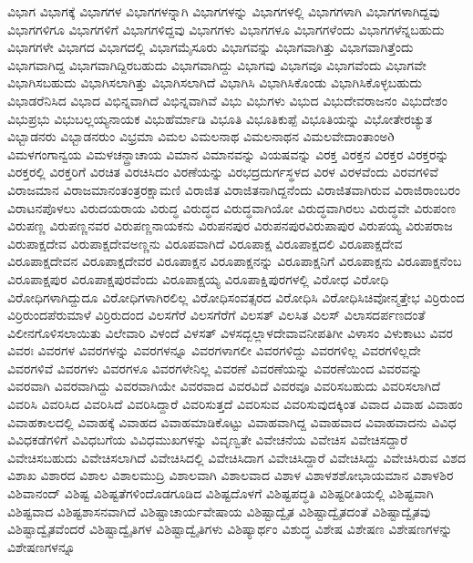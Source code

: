 {ವಿಭಾಗ
ವಿಭಾಗಕ್ಕೆ
ವಿಭಾಗಗಳ
ವಿಭಾಗಗಳನ್ನಾಗಿ
ವಿಭಾಗಗಳನ್ನು
ವಿಭಾಗಗಳಲ್ಲಿ
ವಿಭಾಗಗಳಾಗಿ
ವಿಭಾಗಗಳಾಗಿದ್ದವು
ವಿಭಾಗಗಳಿಗೂ
ವಿಭಾಗಗಳಿಗೆ
ವಿಭಾಗಗಳಿದ್ದವು
ವಿಭಾಗಗಳು
ವಿಭಾಗಗಳೂ
ವಿಭಾಗಗಳೆಂದು
ವಿಭಾಗಗಳೆನ್ನಬಹುದು
ವಿಭಾಗಗಳೇ
ವಿಭಾಗದ
ವಿಭಾಗದಲ್ಲಿ
ವಿಭಾಗಮೈಸೂರು
ವಿಭಾಗವನ್ನು
ವಿಭಾಗವಾಗಿತ್ತು
ವಿಭಾಗವಾಗಿತ್ತೆಂದು
ವಿಭಾಗವಾಗಿದ್ದ
ವಿಭಾಗವಾಗಿದ್ದಿರಬಹುದು
ವಿಭಾಗವಾಗಿದ್ದು
ವಿಭಾಗವು
ವಿಭಾಗವೂ
ವಿಭಾಗವೆಂದು
ವಿಭಾಗವೇ
ವಿಭಾಗಿಸಬಹುದು
ವಿಭಾಗಿಸಲಾಗಿತ್ತು
ವಿಭಾಗಿಸಲಾಗಿದೆ
ವಿಭಾಗಿಸಿ
ವಿಭಾಗಿಸಿಕೊಂಡು
ವಿಭಾಗಿಸಿಕೊಳ್ಳಬಹುದು
ವಿಭಾಡರೆನಿಸಿದ
ವಿಭಾದ
ವಿಭಿನ್ನವಾಗಿದೆ
ವಿಭಿನ್ನವಾಗಿವೆ
ವಿಭು
ವಿಭುಗಳು
ವಿಭುದ
ವಿಭುದೇವರಾಜನಂ
ವಿಭುದೇಶಂ
ವಿಭುಪ್ರಭು
ವಿಭುಬಲ್ಲಯ್ಯನಾಯಕ
ವಿಭುಹೆರ್ಮಾಡಿ
ವಿಭೂತಿ
ವಿಭೂತಿಕುಪ್ಪೆ
ವಿಭೂತಿಯನ್ನು
ವಿಭೋತೇರಚ್ಯುತ
ವಿಭ್ಬಾಡನರು
ವಿಭ್ಬಾಡನರುಂ
ವಿಭ್ರಮಾ
ವಿಮಲ
ವಿಮಲನಾಥ
ವಿಮಲನಾಥನ
ವಿಮಲವೇದಾಂತಾಂಅð
ವಿಮಳಗಂಗಾನ್ವಯ
ವಿಮಳಚನ್ದ್ರಾಚಾಯ
ವಿಮಾನ
ವಿಮಾನವನ್ನು
ವಿಯಷವನ್ನು
ವಿರಕ್ತ
ವಿರಕ್ತನ
ವಿರಕ್ತರ
ವಿರಕ್ತರನ್ನು
ವಿರಕ್ತರಲ್ಲಿ
ವಿರಕ್ತರಿಗೆ
ವಿರಚಿತ
ವಿರಚಿಸಿದಂ
ವಿರಣೆಯನ್ನು
ವಿರಭದ್ರದುರ್ಗಸ್ಥಳದ
ವಿರಳ
ವಿರಳವೆಂದು
ವಿರವಗಳಿವೆ
ವಿರಾಜಮಾನ
ವಿರಾಜಮಾನಂತಂತ್ರರಕ್ಷಾಮಣಿ
ವಿರಾಜಿತ
ವಿರಾಜಿತನಾಗಿದ್ದನೆಂದು
ವಿರಾಜಿತವಾಗಿರುವ
ವಿರಾಜಿರಾಂಬರಂ
ವಿರಾಟನಪೊಳಲು
ವಿರುದಯರಾಯ
ವಿರುದ್ಧ
ವಿರುದ್ಧದ
ವಿರುದ್ಧವಾಗಿಯೋ
ವಿರುದ್ಧವಾಗಿರಲು
ವಿರುದ್ಧವೇ
ವಿರುಪಂಣ
ವಿರುಪಣ್ಣ
ವಿರುಪಣ್ಣನವರ
ವಿರುಪಣ್ಣನಾಯಕನು
ವಿರುಪನಪುರ
ವಿರುಪನಪುರವಿರುಪಾಪುರ
ವಿರುಪಯ್ಯ
ವಿರುಪರಾಜ
ವಿರುಪಾಕ್ಷದೇವ
ವಿರುಪಾಕ್ಷದೇವಅಣ್ಣನು
ವಿರೂಪವಾಗಿದೆ
ವಿರೂಪಾಕ್ಷ
ವಿರೂಪಾಕ್ಷದಲಿ
ವಿರೂಪಾಕ್ಷದೇವ
ವಿರೂಪಾಕ್ಷದೇವನ
ವಿರೂಪಾಕ್ಷದೇವರ
ವಿರೂಪಾಕ್ಷನ
ವಿರೂಪಾಕ್ಷನನ್ನು
ವಿರೂಪಾಕ್ಷನಿಗೆ
ವಿರೂಪಾಕ್ಷನು
ವಿರೂಪಾಕ್ಷನೆಂಬ
ವಿರೂಪಾಕ್ಷಪುರ
ವಿರೂಪಾಕ್ಷಪುರವೆಂದು
ವಿರೂಪಾಕ್ಷಯ್ಯ
ವಿರೂಪಾಕ್ಷಿಪುರಗಳಲ್ಲಿ
ವಿರೋಧ
ವಿರೋಧಿ
ವಿರೋಧಿಗಳಾಗಿದ್ದುದೂ
ವಿರೋಧಿಗಳಾಗಿರಲಿಲ್ಲ
ವಿರೋಧಿಸಂವತ್ಸರದ
ವಿರೋಧಿಸಿ
ವಿರೋಧಿಸಿಚಿವೋನ್ಮತ್ತೇಭ
ವಿರ್ರಿರುಂದ
ವಿರ್ರಿರುಂದಪೆರುಮಾಳೆ
ವಿರ್ರಿರುದಂದ
ವಿಲಸಗೆರೆ
ವಿಲಸಗೆರೆಗೆ
ವಿಲಸತ್
ವಿಲಸಿತ
ವಿಲಸ್
ವಿಲಾಸದರ್ಪಣದಂತೆ
ವಿಲೀನಗೊಳಿಸಲಾಯಿತು
ವಿಲೇವಾರಿ
ವಿಳಂದೆ
ವಿಳಸತ್
ವಿಳಸದ್ಬಲ್ಲಾಳದೇವಾವನೀಪತಿಗೀ
ವಿಳಾಸಂ
ವಿಳುಕಾಟು
ವಿವರ
ವಿವರಃ
ವಿವರಗಳ
ವಿವರಗಳನ್ನು
ವಿವರಗಳನ್ನೂ
ವಿವರಗಳಾಗಲೀ
ವಿವರಗಳಿದ್ದು
ವಿವರಗಳಿಲ್ಲ
ವಿವರಗಳಿಲ್ಲದೇ
ವಿವರಗಳಿವೆ
ವಿವರಗಳು
ವಿವರಗಳೂ
ವಿವರಗಳೇನಿಲ್ಲ
ವಿವರಣೆ
ವಿವರಣೆಯನ್ನು
ವಿವರಣೆಯಿಂದ
ವಿವರವನ್ನು
ವಿವರವಾಗಿ
ವಿವರವಾಗಿದ್ದು
ವಿವರವಾಗಿಯೇ
ವಿವರವಾದ
ವಿವರವಿದೆ
ವಿವರವೂ
ವಿವರಿಸಬಹುದು
ವಿವರಿಸಲಾಗಿದೆ
ವಿವರಿಸಿ
ವಿವರಿಸಿದ
ವಿವರಿಸಿದೆ
ವಿವರಿಸಿದ್ದಾರೆ
ವಿವರಿಸುತ್ತದೆ
ವಿವರಿಸುವ
ವಿವರಿಸುವುದಕ್ಕಿಂತ
ವಿವಾದ
ವಿವಾಹ
ವಿವಾಹಂ
ವಿವಾಹಕಾಲದಲ್ಲಿ
ವಿವಾಹಕ್ಕೆ
ವಿವಾಹದ
ವಿವಾಹಮಾಡಿಕೊಟ್ಟು
ವಿವಾಹವಾಗಿದ್ದ
ವಿವಾಹವಾದ
ವಿವಾಹವಾದನು
ವಿವಿಧ
ವಿವಿಧಕಡೆಗಳಿಗೆ
ವಿವಿಧಬಗೆಯ
ವಿವಿಧಮುಖಗಳನ್ನು
ವಿವೃಣ್ವತೇ
ವಿವೇಚನೆಯ
ವಿವೇಚಿಸ
ವಿವೇಚಿಸದ್ದಾರೆ
ವಿವೇಚಿಸಬಹುದು
ವಿವೇಚಿಸಲಾಗಿದೆ
ವಿವೇಚಿಸಿದಲ್ಲಿ
ವಿವೇಚಿಸಿದಾಗ
ವಿವೇಚಿಸಿದ್ದಾರೆ
ವಿವೇಚಿಸಿದ್ದು
ವಿವೇಚಿಸಿರುವ
ವಿಶದ
ವಿಶಾಖ
ವಿಶಾರದ
ವಿಶಾಲ
ವಿಶಾಲಮುದ್ರಿ
ವಿಶಾಲವಾಗಿ
ವಿಶಾಲವಾದ
ವಿಶಾಳ
ವಿಶಾಳಶಶೋಭಾಯಮಾನ
ವಿಶಾಳಶಿರ
ವಿಶಿವಾನಂದ್
ವಿಶಿಷ್ಟ
ವಿಶಿಷ್ಟತೆಗಳಿಂದೊಡಗೂಡಿದ
ವಿಶಿಷ್ಟದೊಳಗೆ
ವಿಶಿಷ್ಟಪದ್ಧತಿ
ವಿಶಿಷ್ಟರೀತಿಯಲ್ಲಿ
ವಿಶಿಷ್ಟವಾಗಿ
ವಿಶಿಷ್ಟವಾದ
ವಿಶಿಷ್ಟಶಾಸನವಾಗಿದೆ
ವಿಶಿಷ್ಟಾಚಾರ್ಯವೇಷಾಯ
ವಿಶಿಷ್ಟಾದ್ವೈತ
ವಿಶಿಷ್ಟಾದ್ವೈತದಂತೆ
ವಿಶಿಷ್ಟಾದ್ವೈತವು
ವಿಶಿಷ್ಟಾದ್ವೈತವೆಂದರೆ
ವಿಶಿಷ್ಟಾದ್ವೈತಿಗಳ
ವಿಶಿಷ್ಟಾದ್ವೈತಿಗಳು
ವಿಶಿಷ್ಯಾರ್ಥಂ
ವಿಶುದ್ಧ
ವಿಶೇಷ
ವಿಶೇಷಣ
ವಿಶೇಷಣಗಳನ್ನು
ವಿಶೇಷಣಗಳನ್ನೂ
}
